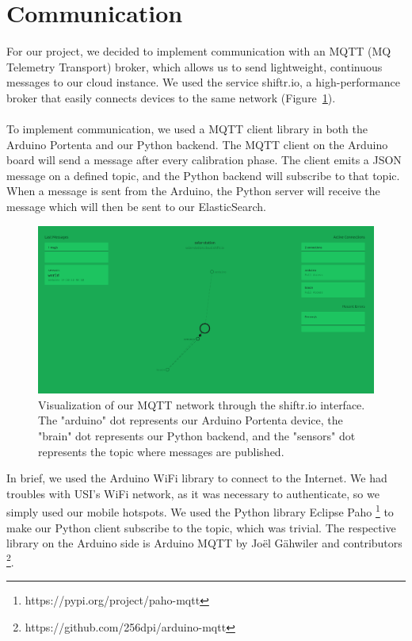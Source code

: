 \section*{Communication}

For our project, we decided to implement communication with an MQTT (MQ Telemetry Transport) broker, which allows us to send lightweight, continuous messages to our cloud instance.
We used the service shiftr.io, a high-performance broker that easily connects devices to the same network (Figure~\ref{fig:shiftrviz}). \\ \\
To implement communication, we used a MQTT client library in both the Arduino Portenta and our Python backend.
The MQTT client on the Arduino board will send a message after every calibration phase.
The client emits a JSON message on a defined topic, and the Python backend will subscribe to that topic.
When a message is sent from the Arduino, the Python server will receive the message which will then be sent to our ElasticSearch.
\begin{figure}[H]
    \centering
    \includegraphics[width=15cm]{../assets/png/shiftr-network}
    \caption{Visualization of our MQTT network through the shiftr.io interface. The "arduino" dot represents our Arduino Portenta device, the "brain" dot represents our Python backend, and the "sensors" dot represents the topic where messages are published.}
    \label{fig:shiftrviz}
\end{figure}
In brief, we used the Arduino WiFi library to connect to the Internet.
We had troubles with USI's WiFi network, as it was necessary to authenticate, so we simply used our mobile hotspots.
We used the Python library Eclipse Paho \footnote{https://pypi.org/project/paho-mqtt} to make our Python client subscribe to the topic, which was trivial.
The respective library on the Arduino side is Arduino MQTT by Joël Gähwiler and contributors \footnote{https://github.com/256dpi/arduino-mqtt}.
